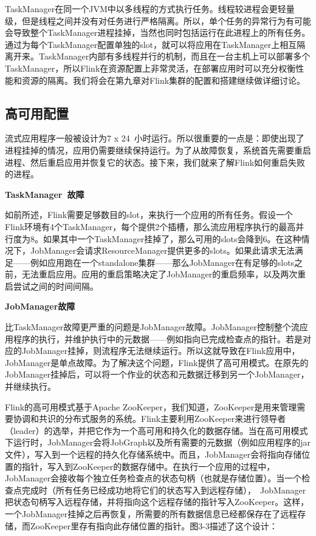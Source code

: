 \documentclass[oneside]{ctexbook}
\begin{document}
TaskManager在同一个JVM中以多线程的方式执行任务。线程较进程会更轻量级，但是线程之间并没有对任务进行严格隔离。所以，单个任务的异常行为有可能会导致整个TaskManager进程挂掉，当然也同时包括运行在此进程上的所有任务。通过为每个TaskManager配置单独的slot，就可以将应用在TaskManager上相互隔离开来。TaskManager内部有多线程并行的机制，而且在一台主机上可以部署多个TaskManager，所以Flink在资源配置上非常灵活，在部署应用时可以充分权衡性能和资源的隔离。我们将会在第九章对Flink集群的配置和搭建继续做详细讨论。

\subsection{高可用配置}

流式应用程序一般被设计为7 x 24 小时运行。所以很重要的一点是：即使出现了进程挂掉的情况，应用仍需要继续保持运行。为了从故障恢复，系统首先需要重启进程、然后重启应用并恢复它的状态。接下来，我们就来了解Flink如何重启失败的进程。

\textbf{TaskManager 故障}

如前所述，Flink需要足够数目的slot，来执行一个应用的所有任务。假设一个Flink环境有4个TaskManager，每个提供2个插槽，那么流应用程序执行的最高并行度为8。如果其中一个TaskManager挂掉了，那么可用的slots会降到6。在这种情况下，JobManager会请求ResourceManager提供更多的slots。如果此请求无法满足——例如应用跑在一个standalone集群——那么JobManager在有足够的slots之前，无法重启应用。应用的重启策略决定了JobManager的重启频率，以及两次重启尝试之间的时间间隔。

\textbf{JobManager故障}

比TaskManager故障更严重的问题是JobManager故障。JobManager控制整个流应用程序的执行，并维护执行中的元数据——例如指向已完成检查点的指针。若是对应的JobManager挂掉，则流程序无法继续运行。所以这就导致在Flink应用中，JobManager是单点故障。为了解决这个问题，Flink提供了高可用模式。在原先的JobManager挂掉后，可以将一个作业的状态和元数据迁移到另一个JobManager，并继续执行。

Flink的高可用模式基于Apache ZooKeeper，我们知道，ZooKeeper是用来管理需要协调和共识的分布式服务的系统。Flink主要利用ZooKeeper来进行领导者（leader）的选举，并把它作为一个高可用和持久化的数据存储。当在高可用模式下运行时，JobManager会将JobGraph以及所有需要的元数据（例如应用程序的jar文件），写入到一个远程的持久化存储系统中。而且，JobManager会将指向存储位置的指针，写入到ZooKeeper的数据存储中。在执行一个应用的过程中，JobManager会接收每个独立任务检查点的状态句柄（也就是存储位置）。当一个检查点完成时（所有任务已经成功地将它们的状态写入到远程存储）， JobManager把状态句柄写入远程存储，并将指向这个远程存储的指针写入ZooKeeper。这样，一个JobManager挂掉之后再恢复，所需要的所有数据信息已经都保存在了远程存储，而ZooKeeper里存有指向此存储位置的指针。图3-3描述了这个设计：
\end{document}
